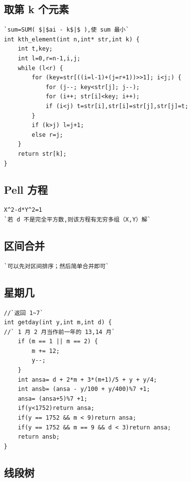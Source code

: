 \documentclass[a4paper]{article}
\begin{document}
\begin{CJK*}{UTF8}{gbsn}
\begin{multicols}{3}
\begin{flushleft}
\subsection{取第 k 个元素}
\begin{lstlisting}
`sum=SUM( $|$ai - k$|$ ),使 sum 最小`
int kth_element(int n,int* str,int k) {
    int t,key;
    int l=0,r=n-1,i,j;
    while (l<r) {
        for (key=str[((i=l-1)+(j=r+1))>>1]; i<j;) {
            for (j--; key<str[j]; j--);
            for (i++; str[i]<key; i++);
            if (i<j) t=str[i],str[i]=str[j],str[j]=t;
        }
        if (k>j) l=j+1;
        else r=j;
    }
    return str[k];
}
\end{lstlisting}

\subsection{Pell 方程}
\begin{lstlisting}
X^2-d*Y^2=1
`若 d 不是完全平方数,则该方程有无穷多组（X,Y）解`
\end{lstlisting}

\subsection{区间合并}
\begin{lstlisting}
`可以先对区间排序；然后简单合并即可`
\end{lstlisting}

\subsection{星期几}
\begin{lstlisting}
//`返回 1~7`
int getday(int y,int m,int d) {
//` 1 月 2 月当作前一年的 13,14 月`
    if (m == 1 || m == 2) {
        m += 12;
        y--;
    }
    int ansa= d + 2*m + 3*(m+1)/5 + y + y/4;
    int ansb= (ansa - y/100 + y/400)%7 +1;
    ansa= (ansa+5)%7 +1;
    if(y<1752)return ansa;
    if(y == 1752 && m < 9)return ansa;
    if(y == 1752 && m == 9 && d < 3)return ansa;
    return ansb;
}
\end{lstlisting}

\subsection{线段树}


\end{flushleft}
\end{multicols}
\end{CJK*}
\end{document}

